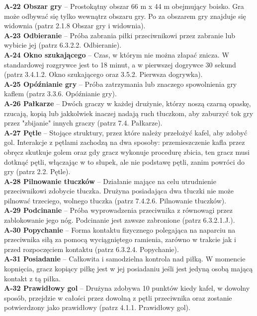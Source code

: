 \documentclass[11pt,a4paper]{article}
\begin{document}
\textbf{A-22 Obszar gry} – Prostokątny obszar 66 m x 44 m obejmujący boisko. Gra może odbywać się tylko wewnątrz obszaru gry. Po za obszarem gry znajduje się widownia (patrz 2.1.8 Obszar gry i widownia).\\
\textbf{A-23 Odbieranie} – Próba zabrania piłki przeciwnikowi przez zabranie lub wybicie jej (patrz 6.3.2.2. Odbieranie).\\
\textbf{A-24 Okno szukającego} – Czas, w którym nie można złapać znicza. W standardowej rozgrywce jest to 18 minut, a w pierwszej dogrywce 30 sekund (patrz 3.4.1.2. Okno szukającego oraz 3.5.2. Pierwsza dogrywka).\\
\textbf{A-25 Opóźnianie gry} – Próba zatrzymania lub znaczego spowolnienia gry kaflem (patrz 3.3.6. Opóźnianie gry).\\
\textbf{A-26 Pałkarze} – Dwóch graczy w każdej drużynie, którzy noszą czarną opaskę, rzucają, kopią lub jakkolwiek inaczej nadają ruch tłuczkom, aby zaburzyć tok gry przez "zbijanie" innych graczy (patrz 7.4. Pałkarze).\\
\textbf{A-27 Pętle} – Stojące struktury, przez które należy przełożyć kafel, aby zdobyć gol. Interakcje z pętlami zachodzą na dwa sposoby: przemieszczenie kafla przez obręcz skutkuje golem oraz gdy gracz wykonuje procedurę zbicia, ten gracz musi dotknąć pętli, włączając w to słupek, ale nie podstawę pętli, zanim powróci do gry (patrz 2.2. Pętle).\\
\textbf{A-28 Pilnowanie tłuczków} – Działanie mające na celu utrudnienie przeciwnikowi zdobycie tłuczka. Drużyna posiadająca dwa tłuczki nie może pilnować trzeciego, wolnego tłuczka (patrz 7.4.2.6. Pilnowanie tłuczków).\\
\textbf{A-29 Podcinanie} – Próba wyprowadzenia przeciwnika z równowagi przez zablokowanie jego nóg. Podcinanie jest zawsze zabronione (patrz 6.3.2.1.J.).\\
\textbf{A-30 Popychanie} – Forma kontaktu fizycznego polegająca na naparciu na przeciwnika siłą za pomocą wyciągniętego ramienia, zarówno w trakcie jak i przed rozpoczęciem kontaktu (patrz 6.3.2.4. Popychanie).\\
\textbf{A-31 Posiadanie} – Całkowita i samodzielna kontrola nad piłką. W momencie kopnięcia, gracz kopiący piłkę jest w jej posiadaniu jeśli jest jedyną osobą mającą kontakt z tą piłka.\\
\textbf{A-32 Prawidłowy gol} – Drużyna zdobywa 10 punktów kiedy kafel, w dowolny sposób, przejdzie w całości przez dowolną z pętli przeciwnika oraz zostanie potwierdzony jako prawidłowy (patrz 4.1.1. Prawidłowy gol).\\
\end{document}
